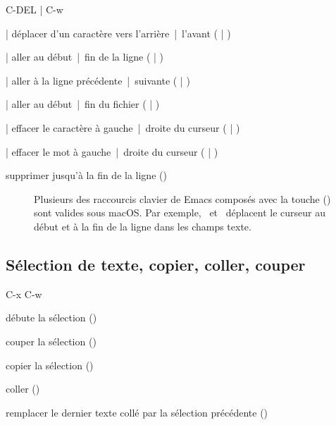 \begin{ttscript}{C-DEL | C-w}
  \raggedright
\item[\code{C-b} | \code{C-f}] déplacer d'un caractère vers l'arrière~|~l'avant
  ( | )
\item[\code{C-a} | \code{C-e}] aller au début~|~fin de la ligne
  ( | )
\item[\code{C-p} | \code{C-n}] aller à la ligne précédente~|~suivante
  ( | )
\item[\code{M-<} | \code{M->}] aller au début~|~fin du fichier
  ( | ) \\[\baselineskip]
\item[\code{DEL} | \code{C-d}] effacer le caractère à
  gauche~|~droite du curseur ( | )
\item[\code{M-DEL} | \code{M-d}] effacer le mot à gauche~|~droite
  du curseur ( | )
\item[\code{C-k}] supprimer jusqu'à la fin de la ligne ()
\end{ttscript}

\begin{figure}[ht]
  \begin{osx}
    Plusieurs des raccourcis clavier de Emacs composés avec la touche
     (\ctlkey) sont valides sous macOS. Par exemple,
    \ctlkey\, et \ctlkey\, déplacent le curseur au
    début et à la fin de la ligne dans les champs texte.
  \end{osx}
\end{figure}


\subsection{Sélection de texte, copier, coller, couper}
\label{emacs+ess:commandes:selection}

\begin{ttscript}{C-x C-w}
  \raggedright
\item[\code{C-SPC}] débute la sélection ()
\item[\code{C-w}] couper la sélection ()
\item[\code{M-w}] copier la sélection ()
\item[\code{C-y}] coller ()
\item[\code{M-y}] remplacer le dernier texte collé par la
  sélection précédente ()
\end{ttscript}

